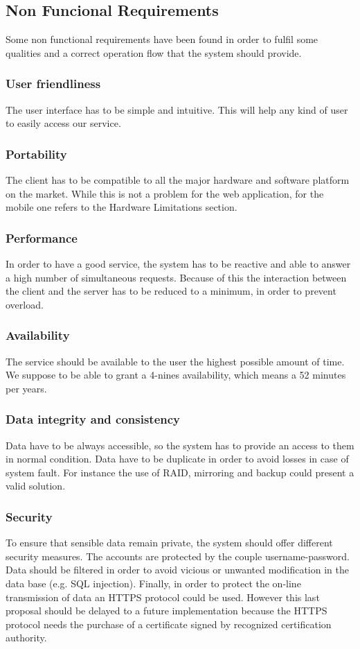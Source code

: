 \subsection{Non Funcional Requirements}
Some non functional requirements have been found in order to fulfil
some qualities and a correct operation flow that the system should provide.
\subsubsection{User friendliness}
The user interface has to be simple and intuitive. This will help any kind of user 
to easily access our service.
\subsubsection{Portability}
The client has to be compatible to all the major hardware
and software platform on the market. While this is not a problem for the web application, 
for the mobile one refers to the Hardware Limitations section.
\subsubsection{Performance}
In order to have a good service, the system has to be reactive
and able to answer a high number of simultaneous requests.
Because of this the interaction between the client and the server has
to be reduced to a minimum, in order to prevent overload.
\subsubsection{Availability}
The service should be available to the user the highest possible amount of time.
We suppose to be able to grant a 4-nines availability, which means a 52 minutes per years.
\subsubsection{Data integrity and consistency}
Data have to be always accessible,
so the system has to provide an access to them in
normal condition. Data have to be duplicate in order to avoid
losses in case of system fault. For instance the use of RAID, mirroring
and backup could present a valid solution.
\subsubsection{Security}
To ensure that sensible data
remain private, the system should offer different security measures.
The accounts are protected by the couple username-password. 
Data should be filtered in order to avoid vicious
or unwanted modification in the data base (e.g. SQL injection). Finally, in order to protect the on-line transmission of data an HTTPS protocol could
be used. However this last proposal should be delayed to a future
implementation because the HTTPS protocol needs the purchase of a
certificate signed by recognized certification authority.

